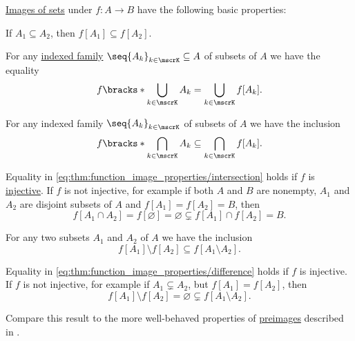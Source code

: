 \begin{proposition}\label{thm:function_image_properties}
  \hyperref[def:multi_valued_function/set_value]{Images of sets} under \( f: A \to B \) have the following basic properties:
  \begin{thmenum}
     If \( A_1 \subseteq A_2 \), then \( f[A_1] \subseteq f[A_2] \).

     For any \hyperref[def:indexed_family]{indexed family} \( \seq{ A_k }_{k \in \mscrK} \subseteq A \) of subsets of \( A \) we have the equality
    \begin{equation}\label{eq:thm:function_image_properties/union}
      f\bracks*{ \bigcup_{k \in \mscrK} A_k } = \bigcup_{k \in \mscrK} f[A_k].
    \end{equation}

     For any indexed family \( \seq{ A_k }_{k \in \mscrK} \) of subsets of \( A \) we have the inclusion
    \begin{equation}\label{eq:thm:function_image_properties/intersection}
      f\bracks*{ \bigcap_{k \in \mscrK} A_k } \subseteq \bigcap_{k \in \mscrK} f[A_k].
    \end{equation}

    Equality in \eqref{eq:thm:function_image_properties/intersection} holds if \( f \) is \hyperref[def:function_invertibility/injective]{injective}. If \( f \) is not injective, for example if both \( A \) and \( B \) are nonempty, \( A_1 \) and \( A_2 \) are disjoint subsets of \( A \) and \( f[A_1] = f[A_2] = B \), then
    \begin{equation*}
      f[A_1 \cap A_2] = f[\varnothing] = \varnothing \subsetneq f[A_1] \cap f[A_2] = B.
    \end{equation*}

     For any two subsets \( A_1 \) and \( A_2 \) of \( A \) we have the inclusion
    \begin{equation}\label{eq:thm:function_image_properties/difference}
      f[A_1] \setminus f[A_2] \subseteq f[A_1 \setminus A_2].
    \end{equation}

    Equality in \eqref{eq:thm:function_image_properties/difference} holds if \( f \) is injective. If \( f \) is not injective, for example if \( A_1 \subsetneq A_2 \), but \( f[A_1] = f[A_2] \), then
    \begin{equation*}
      f[A_1] \setminus f[A_2] = \varnothing \subsetneq f[A_1 \setminus A_2].
    \end{equation*}
  \end{thmenum}

  Compare this result to the more well-behaved properties of \hyperref[thm:function_properties/preimage]{preimages} described in .
\end{proposition}
